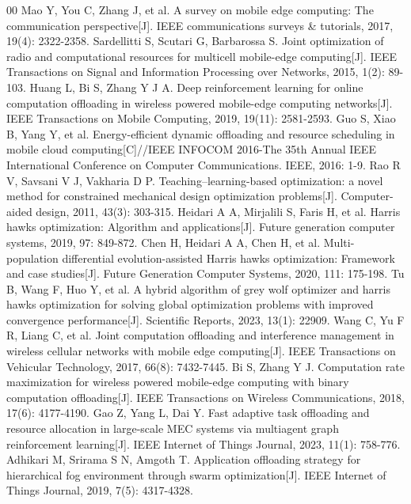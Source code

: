 \documentclass[conference]{IEEEtran}
\begin{document}
\begin{thebibliography}{00}
 Mao Y, You C, Zhang J, et al. A survey on mobile edge computing: The communication perspective[J]. IEEE communications surveys \& tutorials, 2017, 19(4): 2322-2358.
 Sardellitti S, Scutari G, Barbarossa S. Joint optimization of radio and computational resources for multicell mobile-edge computing[J]. IEEE Transactions on Signal and Information Processing over Networks, 2015, 1(2): 89-103.
 Huang L, Bi S, Zhang Y J A. Deep reinforcement learning for online computation offloading in wireless powered mobile-edge computing networks[J]. IEEE Transactions on Mobile Computing, 2019, 19(11): 2581-2593.
 Guo S, Xiao B, Yang Y, et al. Energy-efficient dynamic offloading and resource scheduling in mobile cloud computing[C]//IEEE INFOCOM 2016-The 35th Annual IEEE International Conference on Computer Communications. IEEE, 2016: 1-9.
 Rao R V, Savsani V J, Vakharia D P. Teaching–learning-based optimization: a novel method for constrained mechanical design optimization problems[J]. Computer-aided design, 2011, 43(3): 303-315.
 Heidari A A, Mirjalili S, Faris H, et al. Harris hawks optimization: Algorithm and applications[J]. Future generation computer systems, 2019, 97: 849-872.
Chen H, Heidari A A, Chen H, et al. Multi-population differential evolution-assisted Harris hawks optimization: Framework and case studies[J]. Future Generation Computer Systems, 2020, 111: 175-198.
 Tu B, Wang F, Huo Y, et al. A hybrid algorithm of grey wolf optimizer and harris hawks optimization for solving global optimization problems with improved convergence performance[J]. Scientific Reports, 2023, 13(1): 22909.
 Wang C, Yu F R, Liang C, et al. Joint computation offloading and interference management in wireless cellular networks with mobile edge computing[J]. IEEE Transactions on Vehicular Technology, 2017, 66(8): 7432-7445.
 Bi S, Zhang Y J. Computation rate maximization for wireless powered mobile-edge computing with binary computation offloading[J]. IEEE Transactions on Wireless Communications, 2018, 17(6): 4177-4190.
 Gao Z, Yang L, Dai Y. Fast adaptive task offloading and resource allocation in large-scale MEC systems via multiagent graph reinforcement learning[J]. IEEE Internet of Things Journal, 2023, 11(1): 758-776.
 Adhikari M, Srirama S N, Amgoth T. Application offloading strategy for hierarchical fog environment through swarm optimization[J]. IEEE Internet of Things Journal, 2019, 7(5): 4317-4328.

\end{thebibliography}
\end{document}
